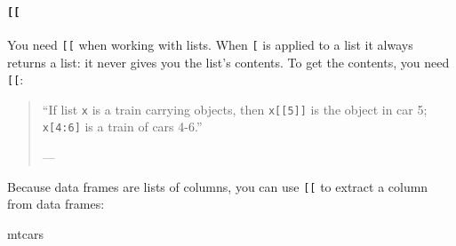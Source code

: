 \documentclass[
]{book}
\newenvironment{Shaded}{\begin{snugshade}}{\end{snugshade}}
\newcommand{\NormalTok}[1]{#1}
\begin{document}
\hypertarget{section}{%
\paragraph{\texorpdfstring{\texttt{{[}{[}}}{{[}{[}}}\label{section}}

You need \texttt{{[}{[}} when working with lists. When \texttt{{[}} is applied to a list it always returns a list: it never gives you the list's contents. To get the contents, you need \texttt{{[}{[}}:

\begin{quote}
``If list \texttt{x} is a train carrying objects, then \texttt{x{[}{[}5{]}{]}} is
the object in car 5; \texttt{x{[}4:6{]}} is a train of cars 4-6.''

--- \citet{RLangTip}
\end{quote}

Because data frames are lists of columns, you can use \texttt{{[}{[}} to extract a column from data frames:

\begin{Shaded}
\begin{Highlighting}[]
\NormalTok{mtcars}
\end{Highlighting}
\end{Shaded}
\end{document}
